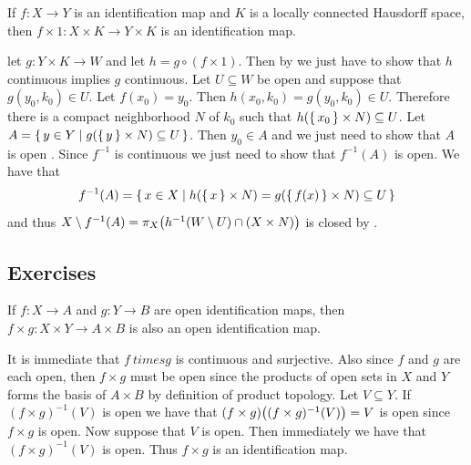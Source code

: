 \documentclass[letterpaper, 11pt, oneside]{book}
\begin{document}
\begin{prop}\label{prop: prod_of_id_and_local_compact}
  If $f\colon X \to Y$ is an identification map and $K$ is a locally connected Hausdorff space, then $f \times 1\colon X \times K \to Y \times K$ is an identification map.
\end{prop}
\begin{pf}
  let $g\colon Y \times K \to W$ and let $h = g \circ (f \times 1)$.
  Then by  we just have to show that $h$ continuous implies $g$ continuous.
  Let $U \subseteq W$ be open and suppose that $g(y_{0}, k_{0}) \in U$.
  Let $f(x_{0}) = y_{0}$.
  Then $h(x_{0}, k_{0}) = g(y_{0}, k_{0}) \in U$.
  Therefore there is a compact neighborhood $N$ of $k_{0}$ such that $h(\set{x_{0}} \times N) \subseteq U$.
  Let $A = \set{y \in Y | g(\set{y} \times N) \subseteq U}$.
  Then $y_{0} \in A$ and we just need to show that $A$ is open .
  Since $f^{-1}$ is continuous we just need to show that $f^{-1}(A)$ is open.
  We have that
  \[
    f^{-1}(A) = \set{x \in X | h(\set{x} \times N) = g(\set{f(x)} \times N) \subseteq U}
  \]
  and thus $X \setminus f^{-1}(A) = \pi_{X}\pqty{h^{-1}(W \setminus U) \cap (X \times N)}$ is closed by .
\end{pf}

\clearpage

\subsection*{Exercises}
\begin{exercise}
  If $f\colon X \to A$ and $g\colon Y \to B$ are open identification maps, then $f \times g\colon X \times Y \to A \times B$ is also an open identification map.
\end{exercise}
\begin{pf}
  It is immediate that $f\ times g$ is continuous and surjective.
  Also since $f$ and $g$ are each open, then $f \times g$ must be open since the products of open sets in $X$ and $Y$ forms the basis of $A \times B$ by definition of product topology.
  Let $V \subseteq Y$.
  If $(f \times g)^{-1}(V)$ is open we have that $(f \times g)\pqty{(f \times g)^{-1}(V)} = V$ is open since $f \times g$ is open.
  Now suppose that $V$ is open.
  Then immediately we have that $(f \times g)^{-1}(V)$ is open.
  Thus $f \times g$ is an identification map.
\end{pf}

\clearpage
\end{document}
